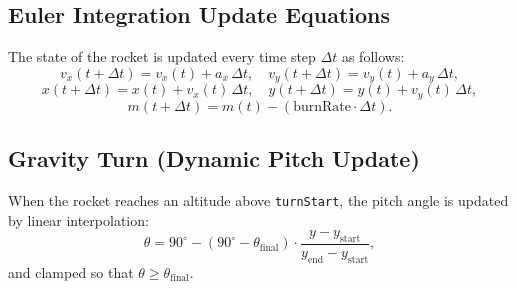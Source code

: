 \documentclass[12pt]{article}
\begin{document}
\subsection*{Euler Integration Update Equations}
The state of the rocket is updated every time step \(\Delta t\) as follows:
\[
v_x(t+\Delta t) = v_x(t) + a_x \, \Delta t, \quad 
v_y(t+\Delta t) = v_y(t) + a_y \, \Delta t,
\]
\[
x(t+\Delta t) = x(t) + v_x(t) \, \Delta t, \quad 
y(t+\Delta t) = y(t) + v_y(t) \, \Delta t,
\]
\[
m(t+\Delta t) = m(t) - (\text{burnRate} \cdot \Delta t).
\]

\subsection*{Gravity Turn (Dynamic Pitch Update)}
When the rocket reaches an altitude above \texttt{turnStart}, the pitch angle is updated by linear interpolation:
\[
\theta = 90^\circ - \left(90^\circ - \theta_{\text{final}}\right) \cdot \frac{y - y_{\text{start}}}{y_{\text{end}} - y_{\text{start}}},
\]
and clamped so that \(\theta \geq \theta_{\text{final}}\).
\end{document}
